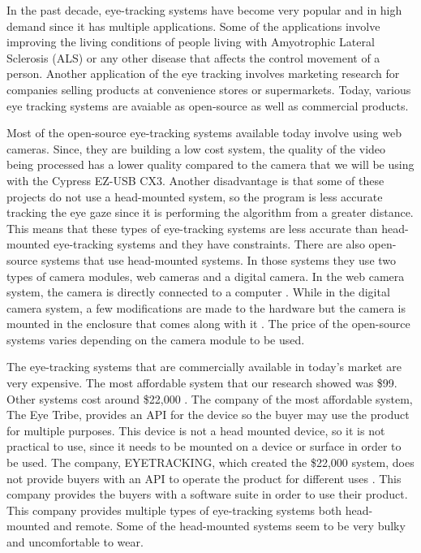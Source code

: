 In the past decade, eye-tracking systems have become very popular and in high demand since it has multiple applications. Some of the applications involve improving the living conditions of people living with Amyotrophic Lateral Sclerosis (ALS) or any other disease that affects the control movement of a person. Another application of the eye tracking involves marketing research for companies selling products at convenience stores or supermarkets. Today, various eye tracking systems are avaiable as open-source as well as commercial products. 

Most of the open-source eye-tracking systems available today involve using web cameras. Since, they are building a low cost system, the quality of the video being processed has a lower quality compared to the camera that we will be using with the Cypress EZ-USB CX3. Another disadvantage is that some of these projects do not use a head-mounted system, so the program is less accurate tracking the eye gaze since it is performing the algorithm from a greater distance. This means that these types of eye-tracking systems are less accurate than head-mounted eye-tracking systems and they have constraints. There are also open-source systems that use head-mounted systems. In those systems they use two types of camera modules, web cameras and a digital camera. In the web camera system, the camera is directly connected to a computer \cite{Kumar}. While in the digital camera system, a few modifications are made to the hardware but the camera is mounted in the enclosure that comes along with it \cite{Derrick}. The price of the open-source systems varies depending on the camera module to be used. 

The eye-tracking systems that are commercially available in today's market are very expensive. The most affordable system that our research showed was \$99. Other systems cost around \$22,000 \cite{Eye}. The company of the most affordable system, The Eye Tribe, provides an API for the device so the buyer may use the product for multiple purposes. This device is not a head mounted device, so it is not practical to use, since it needs to be mounted on a device or surface in order to be used. The company, EYETRACKING, which created the \$22,000 system, does not provide buyers with an API to operate the product for different uses \cite{Eyetribe}. This company provides the buyers with a software suite in order to use their product. This company provides multiple types of eye-tracking systems both head-mounted and remote. Some of the head-mounted systems seem to be very bulky and uncomfortable to wear.